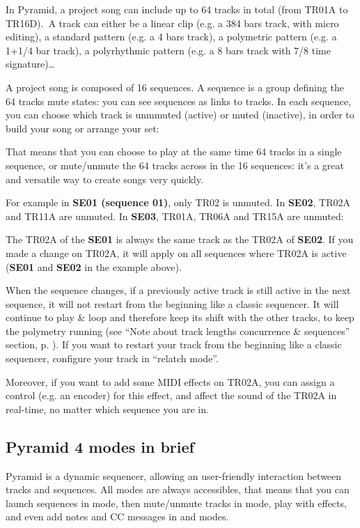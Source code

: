 In Pyramid, a project song can include up to 64 tracks in total (from TR01A to TR16D). A track can either be a linear clip (e.g. a 384 bars track, with micro editing), a standard pattern (e.g. a 4 bars track), a polymetric pattern (e.g. a 1+1/4 bar track), a polyrhythmic pattern (e.g. a 8 bars track with 7/8 time signature)…

A project song is composed of 16 sequences. A sequence is a group defining the 64 tracks mute states: you can see sequences as links to tracks. In each sequence, you can choose which track is unmmuted (active) or muted (inactive), in order to build your song or arrange your set:


That means that you can choose to play at the same time 64 tracks in a single sequence, or mute/unmute the 64 tracks across in the 16 sequences: it's a great and versatile way to create songs very quickly.

For example in \textbf{SE01 (sequence 01)}, only TR02 is unmuted. In \textbf{SE02}, TR02A and TR11A are unmuted. In \textbf{SE03}, TR01A, TR06A and TR15A are unmuted:


The TR02A of the \textbf{SE01} is always the same track as the TR02A of \textbf{SE02}. If you made a change on TR02A, it will apply on all sequences where TR02A is active (\textbf{SE01} and \textbf{SE02} in the example above).

When the sequence changes, if a previously active track is still active in the next sequence, it will not restart from the beginning like a classic sequencer. It will continue to play \& loop and therefore keep its shift with the other tracks, to keep the polymetry running (see ``Note about track lengths concurrence \& sequences'' section, p. \pageref{sec:note-track-len-seq}). If you want to restart your track from the beginning like a classic sequencer, configure your track in ``relatch mode''.

Moreover, if you want to add some MIDI effects on TR02A, you can assign a control (e.g. an encoder) for this effect, and affect the sound of the TR02A in real-time, no matter which sequence you are in.


\subsection{Pyramid 4 modes in brief}

Pyramid is a dynamic sequencer, allowing an user-friendly interaction between tracks and sequences. All modes are always accessibles, that means that you can launch sequences in  mode, then mute/unmute tracks in  mode, play with effects, and even add notes and CC messages in  and   modes.

